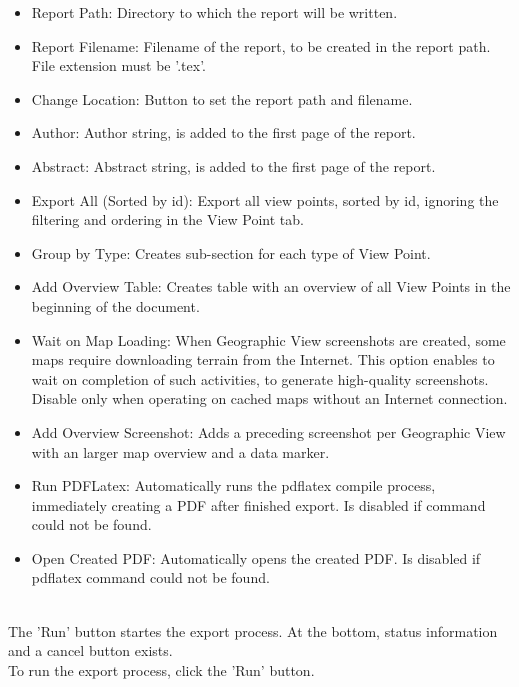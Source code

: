 \begin{itemize}  
\item Report Path: Directory to which the report will be written.
\item Report Filename: Filename of the report, to be created in the report path. File extension must be '.tex'.
\item Change Location: Button to set the report path and filename.
\item Author: Author string, is added to the first page of the report.
\item Abstract: Abstract string, is added to the first page of the report.
\item Export All (Sorted by id): Export all view points, sorted by id, ignoring the filtering and ordering in the View Point tab.
\item Group by Type: Creates sub-section for each type of View Point.
\item Add Overview Table: Creates table with an overview of all View Points in the beginning of the document. 
\item Wait on Map Loading: When Geographic View screenshots are created, some maps require downloading terrain from the Internet.  This option enables to wait on completion of such activities, to generate high-quality screenshots. Disable only when operating on cached maps without an Internet connection.
\item Add Overview Screenshot: Adds a preceding screenshot per Geographic View with an larger map overview and a data marker.
\item Run PDFLatex: Automatically runs the pdflatex compile process, immediately creating a PDF after finished export. Is disabled if command could not be found.
\item Open Created PDF: Automatically opens the created PDF. Is disabled if pdflatex command could not be found.
\end{itemize}
\ \\

The 'Run' button startes the export process. At the bottom, status information and a cancel button exists. \\

To run the export process, click the 'Run' button.

